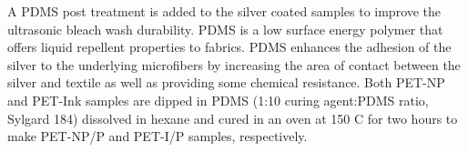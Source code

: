 \documentclass[10pt,letterpaper]{article}
\begin{document}



  


A PDMS post treatment is added to the silver coated samples to improve the ultrasonic bleach wash durability. PDMS is a low surface energy polymer that offers liquid repellent properties to fabrics.\cite{ye_2018} 
PDMS enhances the adhesion of the silver to the underlying microfibers by increasing the area of contact between the silver and textile as well as providing some chemical resistance.  
Both PET-NP and PET-Ink samples are dipped in PDMS (1:10 curing agent:PDMS ratio, Sylgard 184) dissolved in hexane and cured in an oven at 150 \degree C for two hours to make PET-NP/P and PET-I/P samples, respectively. 
\end{document}

